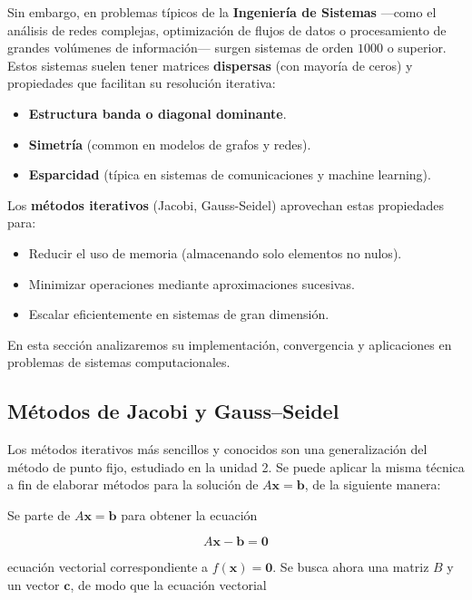 \documentclass[12pt,letterpaper]{article}
\theoremstyle{definition}
\theoremstyle{plain}
\theoremstyle{remark}
\begin{document}
Sin embargo, en problemas típicos de la \textbf{Ingeniería de Sistemas} —como el análisis de redes complejas, optimización de flujos de datos o procesamiento de grandes volúmenes de información— surgen sistemas de orden $1000$ o superior. Estos sistemas suelen tener matrices \textbf{dispersas} (con mayoría de ceros) y propiedades que facilitan su resolución iterativa:

\begin{itemize}
    \item \textbf{Estructura banda o diagonal dominante}.
    \item \textbf{Simetría} (common en modelos de grafos y redes).
    \item \textbf{Esparcidad} (típica en sistemas de comunicaciones y machine learning).
\end{itemize}

Los \textbf{métodos iterativos} (Jacobi, Gauss-Seidel) aprovechan estas propiedades para:
\begin{itemize}
    \item Reducir el uso de memoria (almacenando solo elementos no nulos).
    \item Minimizar operaciones mediante aproximaciones sucesivas.
    \item Escalar eficientemente en sistemas de gran dimensión.
\end{itemize}

En esta sección analizaremos su implementación, convergencia y aplicaciones en problemas de sistemas computacionales.

\subsection{Métodos de Jacobi y Gauss–Seidel}

Los métodos iterativos más sencillos y conocidos son una generalización del método de punto fijo, estudiado en la unidad 2. Se puede aplicar la misma técnica a fin de elaborar métodos para la solución de $A \mathbf{x} = \mathbf{b}$, de la siguiente manera:

Se parte de $A \mathbf{x} = \mathbf{b}$ para obtener la ecuación

\begin{equation}
A \mathbf{x} - \mathbf{b} = \mathbf{0}
\label{eq:3.82}
\tag{1}
\end{equation}

ecuación vectorial correspondiente a $f(\mathbf{x}) = \mathbf{0}$. Se busca ahora una matriz $B$ y un vector $\mathbf{c}$, de modo que la ecuación vectorial
\end{document}
